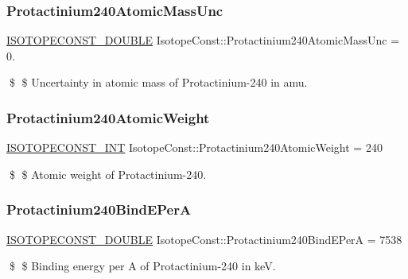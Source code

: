\subsubsection{\texorpdfstring{Protactinium240\+Atomic\+Mass\+Unc}{Protactinium240AtomicMassUnc}}
{\footnotesize\ttfamily \mbox{\hyperlink{group___isotope_const-_macros_ga8f45a7272ce02c0b4c65c44636ed719a}{I\+S\+O\+T\+O\+P\+E\+C\+O\+N\+S\+T\+\_\+\+D\+O\+U\+B\+LE}} Isotope\+Const\+::\+Protactinium240\+Atomic\+Mass\+Unc = 0.}

\$ \$ Uncertainty in atomic mass of Protactinium-\/240 in amu. \mbox{\label{group___isotope_const-_protactinium-_pa240_ga5f3050a62beb7accdb15a923179b6156}} 
\subsubsection{\texorpdfstring{Protactinium240\+Atomic\+Weight}{Protactinium240AtomicWeight}}
{\footnotesize\ttfamily \mbox{\hyperlink{group___isotope_const-_macros_ga5f18360b3e99483a35c32d789e62621c}{I\+S\+O\+T\+O\+P\+E\+C\+O\+N\+S\+T\+\_\+\+I\+NT}} Isotope\+Const\+::\+Protactinium240\+Atomic\+Weight = 240}

\$ \$ Atomic weight of Protactinium-\/240. \mbox{\label{group___isotope_const-_protactinium-_pa240_ga63164f43d215b3ac31e060e16b6e8580}} 
\subsubsection{\texorpdfstring{Protactinium240\+Bind\+E\+PerA}{Protactinium240BindEPerA}}
{\footnotesize\ttfamily \mbox{\hyperlink{group___isotope_const-_macros_ga8f45a7272ce02c0b4c65c44636ed719a}{I\+S\+O\+T\+O\+P\+E\+C\+O\+N\+S\+T\+\_\+\+D\+O\+U\+B\+LE}} Isotope\+Const\+::\+Protactinium240\+Bind\+E\+PerA = 7538}

\$ \$ Binding energy per A of Protactinium-\/240 in keV. \mbox{\label{group___isotope_const-_protactinium-_pa240_gaf999d7fb1e70fa91a2d19c021b1dc2a8}} 
